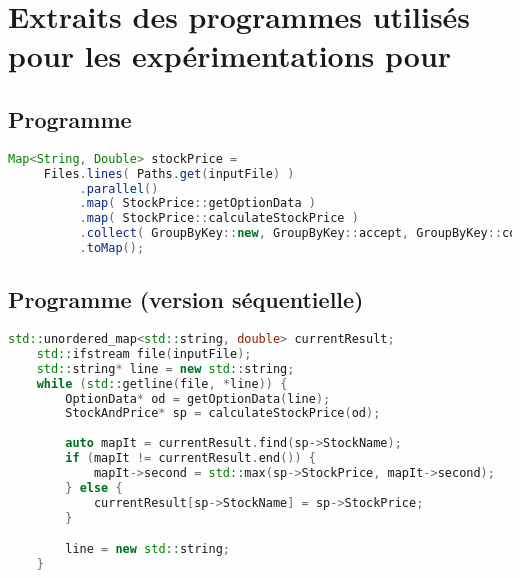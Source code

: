 \chapter{Extraits des programmes utilisés pour les expérimentations pour }
\label{appendice-code-stockprice.ann}

\section{Programme }

\begin{lstlisting}[gobble=3,basicstyle=\ttfamily\footnotesize,language=java]
   Map<String, Double> stockPrice =
     Files.lines( Paths.get(inputFile) )
          .parallel()
          .map( StockPrice::getOptionData )
          .map( StockPrice::calculateStockPrice )
          .collect( GroupByKey::new, GroupByKey::accept, GroupByKey::combine )
          .toMap();
\end{lstlisting}

\newpage
\section{Programme  (version séquentielle)}
\begin{lstlisting}[gobble=4,basicstyle=\ttfamily\footnotesize,language=c++]
    std::unordered_map<std::string, double> currentResult;
    std::ifstream file(inputFile);
    std::string* line = new std::string;
    while (std::getline(file, *line)) {
        OptionData* od = getOptionData(line);
        StockAndPrice* sp = calculateStockPrice(od);
        
        auto mapIt = currentResult.find(sp->StockName);
        if (mapIt != currentResult.end()) {
            mapIt->second = std::max(sp->StockPrice, mapIt->second);
        } else {
            currentResult[sp->StockName] = sp->StockPrice;
        }

        line = new std::string;
    }
\end{lstlisting}

\newpage
